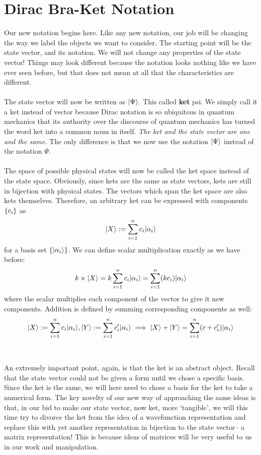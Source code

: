 \section{Dirac Bra-Ket Notation}
Our new notation begins here. Like any new notation, our job will be changing the way we label the objects we want to consider. The starting point will be the state vector, and its notation. We will not change any properties of the state vector! Things may look different because the notation looks nothing like we have ever seen before, but that does not mean at all that the characteristics are different.
\\\\
The state vector will now be written as $|\Psi\rangle$. This called \textbf{ket} psi. We simply call it a ket instead of vector because Dirac notation is so ubiquitous in quantum mechanics that its authority over the discourse of quantum mechanics has turned the word ket into a  common noun in itself. \textit{The ket and the state vector are one and the same.} The only difference is that we now use the notation $|\Psi\rangle$ instead of the notation $\Psi$. 
\\\\
The space of possible physical states will now be called the ket space instead of the state space. Obviously, since kets are the same as state vectors, kets are still in bijection with physical states. The vectors which span the ket space are also kets themselves. Therefore, an arbitrary ket can be expressed with components $\{c_{i}\}$ as $$|X\rangle:=\sum_{i=1}^{n}c_{i}|\alpha_{i}\rangle$$ for a basis set $\{|\alpha_{i}\rangle\}$. We can define scalar multiplication exactly as we have before:
$$
k\times|X\rangle=k\sum_{i=1}^{n}c_{i}|\alpha_{i}\rangle=\sum_{i=1}^{n}(kc_{i})|\alpha_{i}\rangle
$$
where the scalar multiplies each component of the vector to give it new components. Addition is defined by summing corresponding components as well:
$$
|X\rangle:=\sum_{i=1}^{n}c_{i}|\alpha_{i}\rangle, |Y\rangle:=\sum_{i=1}^{n}c'_{i}|\alpha_{i}\rangle\implies |X\rangle+|Y\rangle=\sum_{i=1}^{n}(c+c'_{i})|\alpha_{i}\rangle
$$
\\\\
An extremely important point, again, is that the ket is an abstract object. Recall that the state vector could not be given a form until we chose a specific basis. Since the ket is the same, we will here need to chose a basis for the ket to take a numerical form. The key novelty of our new way of approaching the same ideas is that, in our bid to make our state vector, now ket, more `tangible', we will this time try to divorce the ket from the idea of a wavefunction representation and replace this with yet another representation in bijection to the state vector-- a matrix representation! This is because ideas of matrices will be very useful to us in our work and manipulation. 
